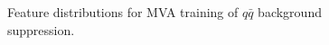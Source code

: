 \begin{figure}[H]
\caption{Feature distributions for MVA training of $q\bar q$ background suppression.}
\end{figure}

